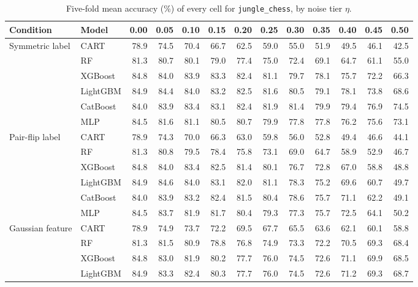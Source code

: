 \begin{table}[p]
\centering
\tiny
\setlength{\tabcolsep}{2.6pt}
\caption{Five-fold mean accuracy (\%) of every cell for \texttt{jungle\_chess}, by noise tier $\eta$.}
\label{tab:grid_jungle_chess}
\begin{tabular}{@{}llrrrrrrrrrrr@{}}
\toprule
Condition & Model & 0.00 & 0.05 & 0.10 & 0.15 & 0.20 & 0.25 & 0.30 & 0.35 & 0.40 & 0.45 & 0.50 \\
\midrule
Symmetric label & CART & 78.9 & 74.5 & 70.4 & 66.7 & 62.5 & 59.0 & 55.0 & 51.9 & 49.5 & 46.1 & 42.5 \\
 & RF & 81.3 & 80.7 & 80.1 & 79.0 & 77.4 & 75.0 & 72.4 & 69.1 & 64.7 & 61.1 & 55.0 \\
 & XGBoost & 84.8 & 84.0 & 83.9 & 83.3 & 82.4 & 81.1 & 79.7 & 78.1 & 75.7 & 72.2 & 66.3 \\
 & LightGBM & 84.9 & 84.4 & 84.0 & 83.2 & 82.5 & 81.6 & 80.5 & 79.1 & 78.1 & 73.8 & 68.6 \\
 & CatBoost & 84.0 & 83.9 & 83.4 & 83.1 & 82.4 & 81.9 & 81.4 & 79.9 & 79.4 & 76.9 & 74.5 \\
 & MLP & 84.5 & 81.6 & 81.1 & 80.5 & 80.7 & 79.9 & 77.8 & 77.8 & 76.2 & 75.6 & 73.1 \\
\midrule
Pair-flip label & CART & 78.9 & 74.3 & 70.0 & 66.3 & 63.0 & 59.8 & 56.0 & 52.8 & 49.4 & 46.6 & 44.1 \\
 & RF & 81.3 & 80.8 & 79.5 & 78.4 & 75.8 & 73.1 & 69.0 & 64.7 & 58.9 & 52.9 & 46.7 \\
 & XGBoost & 84.8 & 84.0 & 83.4 & 82.5 & 81.4 & 80.1 & 76.7 & 72.8 & 67.0 & 58.8 & 48.8 \\
 & LightGBM & 84.9 & 84.6 & 84.0 & 83.1 & 82.0 & 81.1 & 78.3 & 75.2 & 69.6 & 60.7 & 49.7 \\
 & CatBoost & 84.0 & 83.9 & 83.2 & 82.4 & 81.5 & 80.4 & 78.6 & 75.7 & 71.1 & 62.2 & 49.1 \\
 & MLP & 84.5 & 83.7 & 81.9 & 81.7 & 80.4 & 79.3 & 77.3 & 75.7 & 72.5 & 64.1 & 50.2 \\
\midrule
Gaussian feature & CART & 78.9 & 74.9 & 73.7 & 72.2 & 69.5 & 67.7 & 65.5 & 63.6 & 62.1 & 60.1 & 58.8 \\
 & RF & 81.3 & 81.5 & 80.9 & 78.8 & 76.8 & 74.9 & 73.3 & 72.2 & 70.5 & 69.3 & 68.4 \\
 & XGBoost & 84.8 & 83.0 & 81.9 & 80.2 & 77.7 & 76.0 & 74.5 & 72.6 & 71.1 & 69.9 & 68.5 \\
 & LightGBM & 84.9 & 83.3 & 82.4 & 80.3 & 77.7 & 76.0 & 74.5 & 72.6 & 71.2 & 69.3 & 68.7 \\

\end{tabular}
\end{table}
